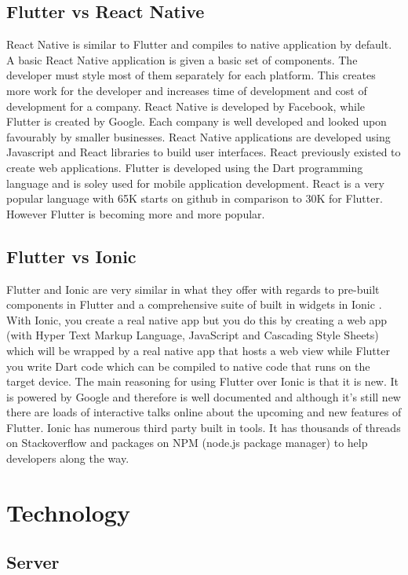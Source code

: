 \subsection{Flutter vs React Native}
React Native is similar to Flutter and compiles to native application by default. A basic React Native application is given a basic set of components. The developer must style most of them separately for each platform. This creates more work for the developer and increases time of development and cost of development for a company. React Native is developed by Facebook, while Flutter is created by Google. Each company is well developed and looked upon favourably by smaller businesses. React Native applications are developed using Javascript and React libraries to build user interfaces. React previously existed to create web applications. Flutter is developed using the Dart programming language and is soley used for mobile application development. React is a very popular language with 65K starts on github in comparison to 30K for Flutter. However Flutter is becoming more and more popular. \cite{FlutterVS_2018} \cite{ReactVsFlutterVsIonic}

\subsection{Flutter vs Ionic}
Flutter and Ionic are very similar in what they offer with regards to pre-built components in Flutter and a comprehensive suite of built in widgets in Ionic \cite{ReactVsFlutterVsIonic}. With Ionic, you create a real native app but you do this by creating a web app (with Hyper Text Markup Language, JavaScript and Cascading Style Sheets) which will be wrapped by a real native app that hosts a web view while Flutter you write Dart code which can be compiled to native code that runs on the target device. The main reasoning for using Flutter over Ionic is that it is new. It is powered by Google and therefore is well documented and although it’s still new there are loads of interactive talks online about the upcoming and new features of Flutter. Ionic has numerous third party built in tools. It has thousands of threads on Stackoverflow and packages on NPM (node.js package manager) to help developers along the way.\cite{FlutterVS_2018}

\section{Technology}
\subsection{Server}

